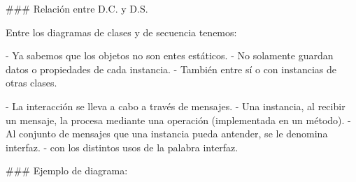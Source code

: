 ### Relación entre D.C. y D.S.

Entre los diagramas de clases y de secuencia tenemos:

- Ya sabemos que los objetos no son entes estáticos.
    - No solamente guardan datos o propiedades de cada instancia.
    - También  entre sí o con instancias de otras clases.

- La interacción se lleva a cabo a través de \alert{mensajes}.
    - Una instancia, al recibir un mensaje, la procesa mediante una operación (implementada en
    un método).
    - Al conjunto de mensajes que una instancia pueda antender, se le denomina \alert{interfaz}.
        -  con los distintos usos de la palabra interfaz.

### Ejemplo de diagrama:

